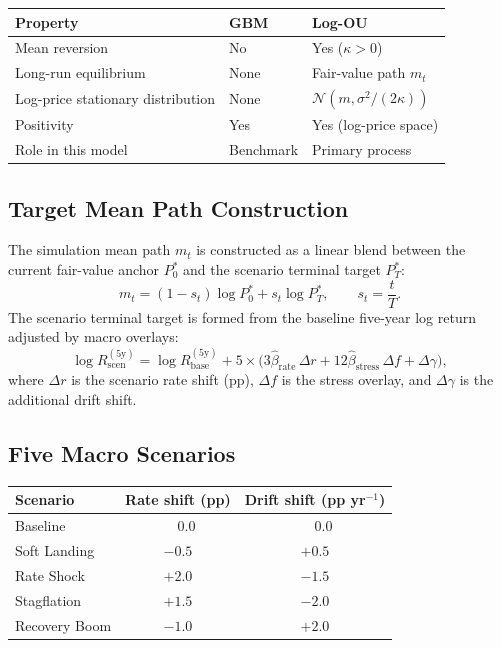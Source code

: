 \documentclass[11pt,a4paper]{article}
\theoremstyle{plain}
\theoremstyle{definition}
\newcommand{\Pstar}{P^{*}}
\newcommand{\kap}{\kappa}
\newcommand{\sig}{\sigma}
\begin{document}
\begin{center}
\begin{tabular}{lll}
\toprule
Property & GBM & Log-OU \\
\midrule
Mean reversion     & No         & Yes ($\kap > 0$) \\
Long-run equilibrium & None     & Fair-value path $m_t$ \\
Log-price stationary distribution & None & $\mathcal{N}(m, \sig^2/(2\kap))$ \\
Positivity         & Yes        & Yes (log-price space) \\
Role in this model & Benchmark  & Primary process \\
\bottomrule
\end{tabular}
\end{center}

\subsection{Target Mean Path Construction}

The simulation mean path $m_t$ is constructed as a linear blend
between the current fair-value anchor $\Pstar_0$ and the scenario
terminal target $\Pstar_T$:
\begin{equation}
  m_t = (1 - s_t)\log\Pstar_0 + s_t\log\Pstar_T,
  \qquad s_t = \frac{t}{T}.
\end{equation}
The scenario terminal target is formed from the baseline five-year
log return adjusted by macro overlays:
\begin{equation}
  \log R^{(5\mathrm{y})}_{\mathrm{scen}}
  = \log R^{(5\mathrm{y})}_{\mathrm{base}}
    + 5 \times
      \bigl(
        3\hat\beta_{\mathrm{rate}}\,\Delta r
        + 12\hat\beta_{\mathrm{stress}}\,\Delta f
        + \Delta\gamma
      \bigr),
\end{equation}
where $\Delta r$ is the scenario rate shift (pp), $\Delta f$ is the
stress overlay, and $\Delta\gamma$ is the additional drift shift.

\subsection{Five Macro Scenarios}

\begin{center}
\begin{tabular}{lcc}
\toprule
Scenario & Rate shift (pp) & Drift shift (pp yr$^{-1}$) \\
\midrule
Baseline      & $\phantom{+}0.0$ & $\phantom{+}0.0$ \\
Soft Landing  & $-0.5$ & $+0.5$ \\
Rate Shock    & $+2.0$ & $-1.5$ \\
Stagflation   & $+1.5$ & $-2.0$ \\
Recovery Boom & $-1.0$ & $+2.0$ \\
\bottomrule
\end{tabular}
\end{center}
\end{document}

